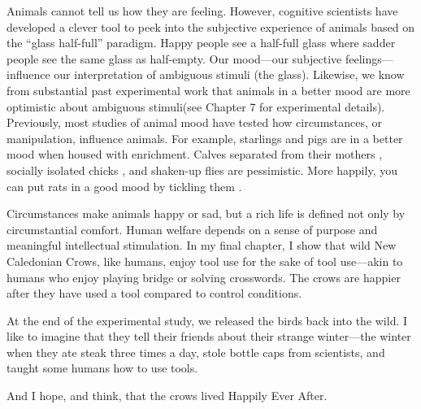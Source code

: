 \vspace{5mm}
\noindent{\textcolor{SchoolColor}{3.1 Testing Animal Mood}}

Animals cannot tell us how they are feeling. However, cognitive scientists have developed a clever tool to peek into the subjective experience of animals based on the “glass half-full” paradigm. Happy people see a half-full glass where sadder people see the same glass as half-empty. Our mood—our subjective feelings—influence our interpretation of ambiguous stimuli (the glass). Likewise, we know from substantial past experimental work that animals in a better mood are more optimistic about ambiguous stimuli\cite{Bateson2011, Burman2008, Douglas2012, Eysenck1991, Harding2004, Mendl2009, Mendl2010a, Mendl2010, Paul2005}(see Chapter 7 for experimental details). Previously, most studies of animal mood have tested how circumstances, or manipulation, influence animals. For example, starlings \cite{Bateson2007, Matheson2008} and pigs \cite{Douglas2012} are in a better mood when housed with enrichment. Calves separated from their mothers \cite{Daros2014}, socially isolated chicks \cite{Salmeto2011}, and shaken-up flies \cite{Deakin2018} are pessimistic. More happily, you can put rats in a good mood by tickling them \cite{Rygula2012}. 

Circumstances make animals happy or sad, but a rich life is defined not only by circumstantial comfort. Human welfare depends on a sense of purpose and meaningful intellectual stimulation. In my final chapter, I show that wild New Caledonian Crows, like humans, enjoy tool use for the sake of tool use—akin to humans who enjoy playing bridge or solving crosswords. The crows are happier after they have used a tool compared to control conditions. 

At the end of the experimental study, we released the birds back into the wild. I like to imagine that they tell their friends about their strange winter—the winter when they ate steak three times a day, stole bottle caps from scientists, and taught some humans how to use tools. 

And I hope, and think, that the crows lived \textcolor{SchoolColor}{Happily Ever After}.

 